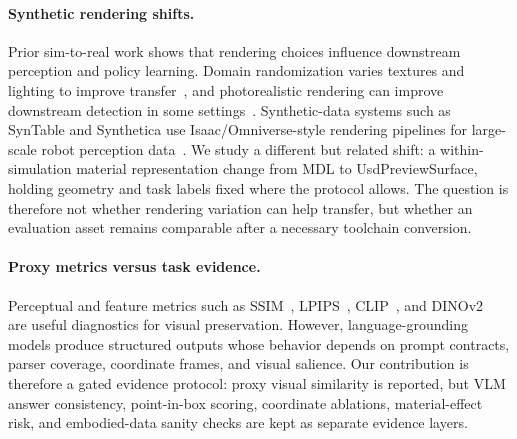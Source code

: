 \paragraph{Synthetic rendering shifts.}
Prior sim-to-real work shows that rendering choices influence downstream
perception and policy learning. Domain randomization varies textures and
lighting to improve transfer~\cite{Tobin2017Domain,Tremblay2018Training}, and
photorealistic rendering can improve downstream detection in some
settings~\cite{Zakharov2022Photo}. Synthetic-data systems such as SynTable and
Synthetica use Isaac/Omniverse-style rendering pipelines for large-scale robot
perception data~\cite{Ng2023SynTable,Singh2025Synthetica}. We study a
different but related shift: a within-simulation material representation change
from MDL to UsdPreviewSurface, holding geometry and task labels fixed where the
protocol allows. The question is therefore not whether rendering variation can
help transfer, but whether an evaluation asset remains comparable after a
necessary toolchain conversion.

\paragraph{Proxy metrics versus task evidence.}
Perceptual and feature metrics such as SSIM~\cite{Wang2004Image},
LPIPS~\cite{Zhang2018Unreasonable}, CLIP~\cite{Radford2021Learning}, and
DINOv2~\cite{Oquab2023DINOv2} are useful diagnostics for visual preservation.
However, language-grounding models produce structured outputs whose behavior
depends on prompt contracts, parser coverage, coordinate frames, and visual
salience. Our contribution is therefore a gated evidence protocol: proxy visual
similarity is reported, but VLM answer consistency, point-in-box scoring,
coordinate ablations, material-effect risk, and embodied-data sanity checks
are kept as separate evidence layers.
